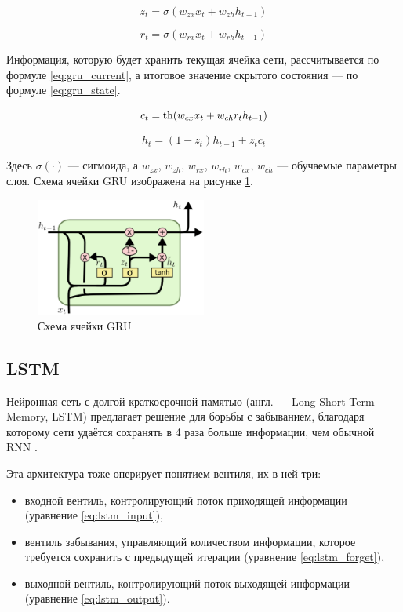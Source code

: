 \begin{equation}
    \label{eq:gru_update}
    z_t = \sigma(w_{zx}x_t+w_{zh}h_{t-1})
\end{equation}

\begin{equation}
    \label{eq:gru_reset}
    r_t = \sigma(w_{rx}x_t+w_{rh}h_{t-1})
\end{equation}

Информация, которую будет хранить текущая ячейка сети, рассчитывается по формуле \ref*{eq:gru_current}, а итоговое значение скрытого состояния --- по формуле \ref*{eq:gru_state}.

\begin{equation}
    \label{eq:gru_current}
    c_t = \operatorname{th}(w_{cx}x_t+w_{ch}r_th_{t-1})
\end{equation}

\begin{equation}
    \label{eq:gru_state}
    h_t = (1-z_t)h_{t-1}+z_tc_t
\end{equation}

Здесь $\sigma(\cdot)$ --- сигмоида, а $w_{zx}$, $w_{zh}$, $w_{rx}$, $w_{rh}$, $w_{cx}$, $w_{ch}$ --- обучаемые параметры слоя.
Схема ячейки GRU изображена на рисунке \ref*{fig:gru}.

\begin{figure}
    \centering
    \includegraphics[width=0.5\textwidth]{../inc/images/gru.png}
    \caption{Схема ячейки GRU}
    \label{fig:gru}
\end{figure}

\subsection{LSTM}

Нейронная сеть с долгой краткосрочной памятью (англ. --- Long Short-Term Memory, LSTM) предлагает решение для борьбы с забыванием, благодаря которому сети удаётся сохранять в 4 раза больше информации, чем обычной RNN \cite{art:rnn}.

Эта архитектура тоже оперирует понятием вентиля, их в ней три:
\begin{itemize}
    \item входной вентиль, контролирующий поток приходящей информации (уравнение \ref*{eq:lstm_input}),
    \item вентиль забывания, управляющий количеством информации, которое требуется сохранить с предыдущей итерации (уравнение \ref*{eq:lstm_forget}),
    \item выходной вентиль, контролирующий поток выходящей информации (уравнение \ref*{eq:lstm_output}).
\end{itemize}

